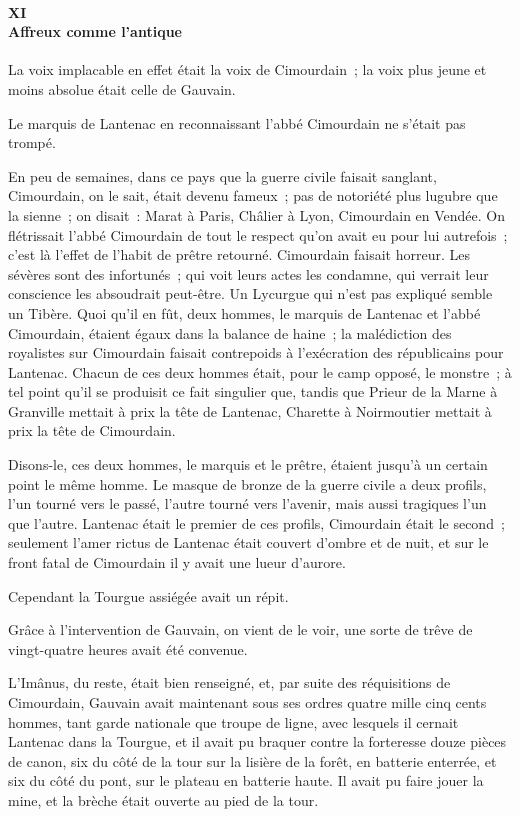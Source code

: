 \documentclass[french,twoside]{book} %
\begin{document}
 \paragraph[{XI. Affreux comme l’antique}]{XI \\
Affreux comme l’antique}
\label{p3l2c11}
\noindent La voix implacable en effet était la voix de Cimourdain ; la voix plus jeune et moins absolue était celle de Gauvain.\par
Le marquis de Lantenac en reconnaissant l’abbé Cimourdain ne s’était pas trompé.\par
En peu de semaines, dans ce pays que la guerre civile faisait sanglant, Cimourdain, on le sait, était devenu fameux ; pas de notoriété plus lugubre que la sienne ; on disait : Marat à Paris, Châlier à Lyon, Cimourdain en Vendée. On flétrissait l’abbé Cimourdain de tout le respect qu’on avait eu pour lui autrefois ; c’est là l’effet de l’habit de prêtre retourné. Cimourdain faisait horreur. Les sévères sont des infortunés ; qui voit leurs actes les condamne, qui verrait leur conscience les absoudrait peut-être. Un Lycurgue qui n’est pas expliqué semble un Tibère. Quoi qu’il en fût, deux hommes, le marquis de Lantenac et l’abbé Cimourdain, étaient égaux dans la balance de haine ; la malédiction des royalistes sur Cimourdain faisait contrepoids à l’exécration des républicains pour Lantenac. Chacun de ces deux hommes était, pour le  camp opposé, le monstre ; à tel point qu’il se produisit ce fait singulier que, tandis que Prieur de la Marne à Granville mettait à prix la tête de Lantenac, Charette à Noirmoutier mettait à prix la tête de Cimourdain.\par
Disons-le, ces deux hommes, le marquis et le prêtre, étaient jusqu’à un certain point le même homme. Le masque de bronze de la guerre civile a deux profils, l’un tourné vers le passé, l’autre tourné vers l’avenir, mais aussi tragiques l’un que l’autre. Lantenac était le premier de ces profils, Cimourdain était le second ; seulement l’amer rictus de Lantenac était couvert d’ombre et de nuit, et sur le front fatal de Cimourdain il y avait une lueur d’aurore.\par
Cependant la Tourgue assiégée avait un répit.\par
Grâce à l’intervention de Gauvain, on vient de le voir, une sorte de trêve de vingt-quatre heures avait été convenue.\par
L’Imânus, du reste, était bien renseigné, et, par suite des réquisitions de Cimourdain, Gauvain avait maintenant sous ses ordres quatre mille cinq cents hommes, tant garde nationale que troupe de ligne, avec lesquels il cernait Lantenac dans la Tourgue, et il avait pu braquer contre la forteresse douze pièces de canon, six du côté de la tour sur la lisière de la forêt, en batterie enterrée, et six du côté du pont, sur le plateau en batterie haute. Il avait pu faire jouer la mine, et la brèche était ouverte au pied de la tour.\par
\end{document}
